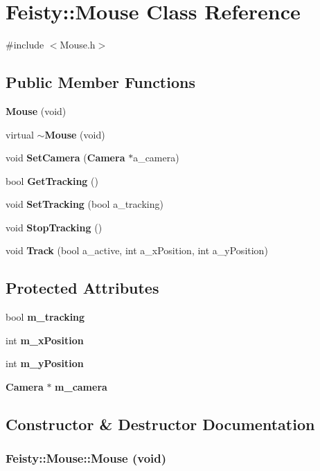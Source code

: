 \section{Feisty::Mouse Class Reference}
\label{class_feisty_1_1_mouse}


{\ttfamily \#include $<$Mouse.h$>$}\subsection*{Public Member Functions}
\begin{DoxyCompactItemize}
\item 
{\bf Mouse} (void)
\item 
virtual {\bf $\sim$Mouse} (void)
\item 
void {\bf SetCamera} ({\bf Camera} $\ast$a\_\-camera)
\item 
bool {\bf GetTracking} ()
\item 
void {\bf SetTracking} (bool a\_\-tracking)
\item 
void {\bf StopTracking} ()
\item 
void {\bf Track} (bool a\_\-active, int a\_\-xPosition, int a\_\-yPosition)
\end{DoxyCompactItemize}
\subsection*{Protected Attributes}
\begin{DoxyCompactItemize}
\item 
bool {\bf m\_\-tracking}
\item 
int {\bf m\_\-xPosition}
\item 
int {\bf m\_\-yPosition}
\item 
{\bf Camera} $\ast$ {\bf m\_\-camera}
\end{DoxyCompactItemize}


\subsection{Constructor \& Destructor Documentation}
\subsubsection[{Mouse}]{\setlength{\rightskip}{0pt plus 5cm}Feisty::Mouse::Mouse (void)\hspace{0.3cm}{\ttfamily  [inline]}}\label{class_feisty_1_1_mouse_a818302ae6bc41be0490553fd1541b997}
